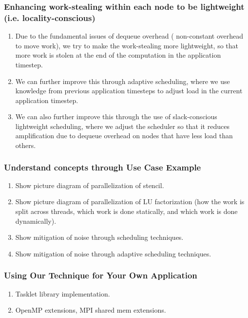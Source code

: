 \begin{frame} 
\frametitle{Enhancing work-stealing within each node to be lightweight (i.e. locality-conscious)}
\begin{enumerate}
\item  Due to the fundamental issues of dequeue overhead ( non-constant overhead to move work), 
we try to make the work-stealing more lightweight, so that more work is stolen 
at the end of the computation in the application timestep.    
\item We can further improve this through adaptive scheduling, where we use knowledge from 
previous application timesteps to adjust load in the current application timestep.  
\item We can also further improve this through the use of slack-conscious lightweight scheduling, 
where we adjust the scheduler so that it reduces amplification due to dequeue overhead on nodes 
that have less load than others. 
\end{enumerate}
\end{frame} 

\begin{frame}
\frametitle{Understand concepts through Use Case Example}
\begin{enumerate} 
\item Show picture diagram of parallelization of stencil.
\item Show picture diagram of parallelization of LU factorization (how the work is split across threads, which work is done statically, and which work is done dynamically).  
\item Show mitigation of noise through scheduling techniques. 
\item Show mitigation of noise through adaptive scheduling techniques. 
\end{enumerate} 
\end{frame} 


\begin{frame} 
\frametitle{Using Our Technique for Your Own Application}
\begin{enumerate} 
\item Tasklet library implementation. 
\item OpenMP extensions, MPI shared mem extensions. 
\end{enumerate} 
\end{frame} 


